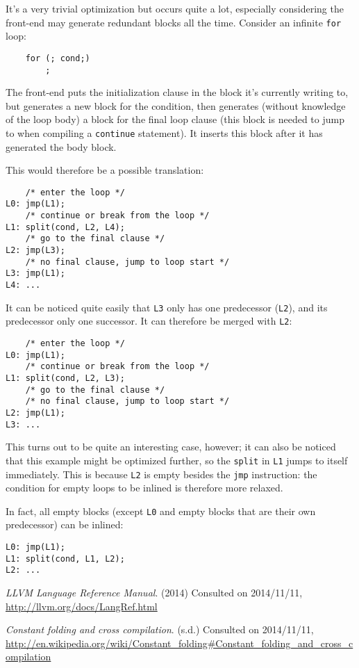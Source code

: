\documentclass[12pt, a4paper]{article}
\begin{document}
It's a very trivial optimization but occurs quite a lot, especially considering
the front-end may generate redundant blocks all the time. Consider an infinite
\verb+for+ loop:

\begin{lstlisting}
	for (; cond;)
		;
\end{lstlisting}

The front-end puts the initialization clause in the block it's currently writing
to, but generates a new block for the condition, then generates (without knowledge
of the loop body) a block for the final loop clause (this block is needed to jump
to when compiling a \verb+continue+ statement). It inserts this block after
it has generated the body block.

This would therefore be a possible translation:

\begin{lstlisting}
	/* enter the loop */
L0:	jmp(L1);
	/* continue or break from the loop */
L1:	split(cond, L2, L4);
	/* go to the final clause */
L2:	jmp(L3);
	/* no final clause, jump to loop start */
L3:	jmp(L1);
L4:	...
\end{lstlisting}

It can be noticed quite easily that \verb+L3+ only has one predecessor (\verb+L2+), and its
predecessor only one successor. It can therefore be merged with \verb+L2+:

\begin{lstlisting}
	/* enter the loop */
L0:	jmp(L1);
	/* continue or break from the loop */
L1:	split(cond, L2, L3);
	/* go to the final clause */
	/* no final clause, jump to loop start */
L2:	jmp(L1);
L3:	...
\end{lstlisting}

This turns out to be quite an interesting case, however; it can also be noticed
that this example might be optimized further, so the \verb+split+ in \verb+L1+
jumps to itself immediately. This is because \verb+L2+ is empty besides the \verb+jmp+
instruction: the condition for empty loops to be inlined is therefore more relaxed.

In fact, all empty blocks (except \verb+L0+ and empty blocks that are their own predecessor) can be inlined:

\begin{lstlisting}
L0:	jmp(L1);
L1:	split(cond, L1, L2);
L2:	...
\end{lstlisting}

\begin{thebibliography}{9}
  \emph{LLVM Language Reference Manual}. (2014) Consulted on 2014/11/11,
  \url{http://llvm.org/docs/LangRef.html}

  \emph{Constant folding and cross compilation}. (s.d.) Consulted on 2014/11/11,
  \url{http://en.wikipedia.org/wiki/Constant_folding#Constant_folding_and_cross_compilation}
\end{thebibliography}
\end{document}
